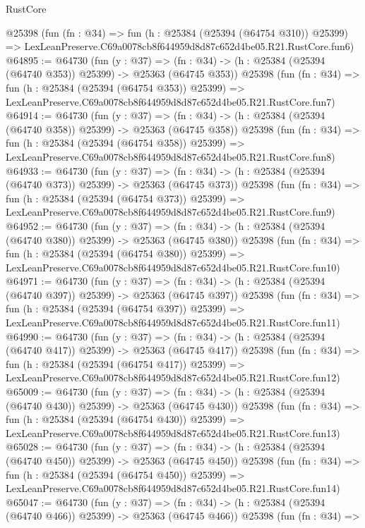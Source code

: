 \begin{lexlean}{RustCore}
\begin{coremodule}
    @25398
    (fun (fn : @34) =>
    fun (h : @25384 (@25394 (@64754 @310)) @25399) =>
    LexLeanPreserve.C69a0078cb8f644959d8d87c652d4be05.R21.RustCore.fun6)
@64895 := @64730
    (fun (y : @37) =>
    (fn : @34) -> (h : @25384 (@25394 (@64740 @353)) @25399) -> @25363 (@64745 @353))
    @25398
    (fun (fn : @34) =>
    fun (h : @25384 (@25394 (@64754 @353)) @25399) =>
    LexLeanPreserve.C69a0078cb8f644959d8d87c652d4be05.R21.RustCore.fun7)
@64914 := @64730
    (fun (y : @37) =>
    (fn : @34) -> (h : @25384 (@25394 (@64740 @358)) @25399) -> @25363 (@64745 @358))
    @25398
    (fun (fn : @34) =>
    fun (h : @25384 (@25394 (@64754 @358)) @25399) =>
    LexLeanPreserve.C69a0078cb8f644959d8d87c652d4be05.R21.RustCore.fun8)
@64933 := @64730
    (fun (y : @37) =>
    (fn : @34) -> (h : @25384 (@25394 (@64740 @373)) @25399) -> @25363 (@64745 @373))
    @25398
    (fun (fn : @34) =>
    fun (h : @25384 (@25394 (@64754 @373)) @25399) =>
    LexLeanPreserve.C69a0078cb8f644959d8d87c652d4be05.R21.RustCore.fun9)
@64952 := @64730
    (fun (y : @37) =>
    (fn : @34) -> (h : @25384 (@25394 (@64740 @380)) @25399) -> @25363 (@64745 @380))
    @25398
    (fun (fn : @34) =>
    fun (h : @25384 (@25394 (@64754 @380)) @25399) =>
    LexLeanPreserve.C69a0078cb8f644959d8d87c652d4be05.R21.RustCore.fun10)
@64971 := @64730
    (fun (y : @37) =>
    (fn : @34) -> (h : @25384 (@25394 (@64740 @397)) @25399) -> @25363 (@64745 @397))
    @25398
    (fun (fn : @34) =>
    fun (h : @25384 (@25394 (@64754 @397)) @25399) =>
    LexLeanPreserve.C69a0078cb8f644959d8d87c652d4be05.R21.RustCore.fun11)
@64990 := @64730
    (fun (y : @37) =>
    (fn : @34) -> (h : @25384 (@25394 (@64740 @417)) @25399) -> @25363 (@64745 @417))
    @25398
    (fun (fn : @34) =>
    fun (h : @25384 (@25394 (@64754 @417)) @25399) =>
    LexLeanPreserve.C69a0078cb8f644959d8d87c652d4be05.R21.RustCore.fun12)
@65009 := @64730
    (fun (y : @37) =>
    (fn : @34) -> (h : @25384 (@25394 (@64740 @430)) @25399) -> @25363 (@64745 @430))
    @25398
    (fun (fn : @34) =>
    fun (h : @25384 (@25394 (@64754 @430)) @25399) =>
    LexLeanPreserve.C69a0078cb8f644959d8d87c652d4be05.R21.RustCore.fun13)
@65028 := @64730
    (fun (y : @37) =>
    (fn : @34) -> (h : @25384 (@25394 (@64740 @450)) @25399) -> @25363 (@64745 @450))
    @25398
    (fun (fn : @34) =>
    fun (h : @25384 (@25394 (@64754 @450)) @25399) =>
    LexLeanPreserve.C69a0078cb8f644959d8d87c652d4be05.R21.RustCore.fun14)
@65047 := @64730
    (fun (y : @37) =>
    (fn : @34) -> (h : @25384 (@25394 (@64740 @466)) @25399) -> @25363 (@64745 @466))
    @25398
    (fun (fn : @34) =>

\end{coremodule}
\end{lexlean}
